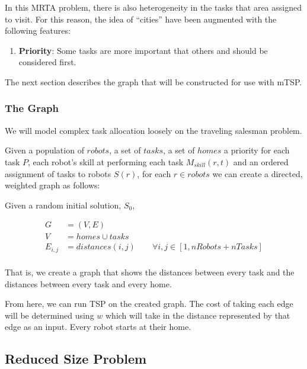 \documentclass[a4paper]{article}
\begin{document}
In this MRTA problem, there is also heterogeneity in the tasks that area assigned to visit. For this reason, the idea of ``cities'' have been augmented with the following features:

\begin{enumerate}
\item \textbf{Priority}: Some tasks are more important that others and should be considered first.
\end{enumerate}

The next section describes the graph that will be constructed for use with mTSP.

\subsubsection{The Graph}
We will model complex task allocation loosely on the traveling salesman problem.

Given a population of $\mathit{robots}$, a set of $\mathit{tasks}$, a set of $\mathit{homes}$ a priority for each task $P$, each robot's skill at performing each task $M_{skill}(r,t)$ and an ordered assignment of tasks to robots $S(r)$, for each $r \in \mathit{robots}$
we can create a directed, weighted graph as follows:

Given a random initial solution, $S_0$,

\begin{align*}
	G &= (V, E) \\
	V &= \mathit{homes} \cup \mathit{tasks} \\
	E_{i, j} &= distances(i,j) \qquad \forall i,j \in [1, nRobots+nTasks] \\
\end{align*}
%

That is, we create a graph that shows the distances between every task and the distances between every task and every home.

From here, we can run TSP on the created graph. The cost of taking each edge will be determined using $w$ which will take in the distance represented by that edge as an input. Every robot starts at their home.

\subsection{Reduced Size Problem}

\end{document}
